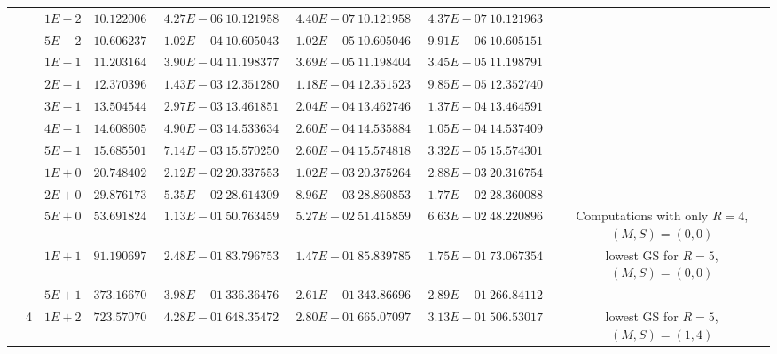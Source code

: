 \begin{landscape}
\begin{table}[ht]
{\begin{tabular}[c]{c|c|c|c|c|c|c|c|c|c|c}
& &$1E-2$ & $10.122006554490$ & $4.27E-06$ & $10.121958901199$ & $4.40E-07$ & $10.121958924256$ & $4.37E-07$ & $10.121963352201$ &  \\
& &$5E-2$ & $10.606237585801$ & $1.02E-04$ & $10.605043121040$ & $1.02E-05$ & $10.605046227528$ & $9.91E-06$ & $10.605151307825$ &  \\
& &$1E-1$ & $11.203164005504$ & $3.90E-04$ & $11.198377948795$ & $3.69E-05$ & $11.198404863749$ & $3.45E-05$ & $11.198791644206$ &  \\
& &$2E-1$ & $12.370396017420$ & $1.43E-03$ & $12.351280581510$ & $1.18E-04$ & $12.351523995048$ & $9.85E-05$ & $12.352740173584$ &  \\
& &$3E-1$ & $13.504544464008$ & $2.97E-03$ & $13.461851176111$ & $2.04E-04$ & $13.462746122656$ & $1.37E-04$ & $13.464591945533$ &  \\
& &$4E-1$ & $14.608605661990$ & $4.90E-03$ & $14.533634757963$ & $2.60E-04$ & $14.535884428949$ & $1.05E-04$ & $14.537409076271$ &  \\
& &$5E-1$ & $15.685501416282$ & $7.14E-03$ & $15.570250047282$ & $2.60E-04$ & $15.574818078556$ & $3.32E-05$ & $15.574301411949$ &  \\
& &$1E+0$ & $20.748402254288$ & $2.12E-02$ & $20.337553481742$ & $1.02E-03$ & $20.375264152845$ & $2.88E-03$ & $20.316754002510$ &  \\
& &$2E+0$ & $29.876173541426$ & $5.35E-02$ & $28.614309748677$ & $8.96E-03$ & $28.860853512576$ & $1.77E-02$ & $28.360088424685$ &  \\
& &$5E+0$ & $53.691824552566$ & $1.13E-01$ & $50.763459667051$ & $5.27E-02$ & $51.415859614987$ & $6.63E-02$ & $48.220896992378$ & \multirow{-20}{3cm}{Computations with only $R=4$, $(M,S)=(0,0)$}  \\ \cline{10-11}
& &$1E+1$ & $91.190697218117$ & $2.48E-01$ & $83.796753131214$ & $1.47E-01$ & $85.839785051119$ & $1.75E-01$ & $73.067354457427$ &  lowest GS for $R=5$, $(M,S)=(0,0)$\\ \cline{10-11}
& &$5E+1$ & $373.166706573103$ & $3.98E-01$ & $336.364762441183$ & $2.61E-01$ & $343.866968316472$ & $2.89E-01$ & $266.841126091951$ &  \\
& \multirow{-23}{*}{4}  &$1E+2$ & $723.570709199507$ & $4.28E-01$ & $648.354721946766$ & $2.80E-01$ & $665.070975971614$ & $3.13E-01$ & $506.530170970484$ & \multirow{-2}{3cm}{lowest GS for $R=5$, $(M,S)=(1,4)$}\\ \cline{2-11}



\end{tabular}}
\end{table}
\end{landscape}
